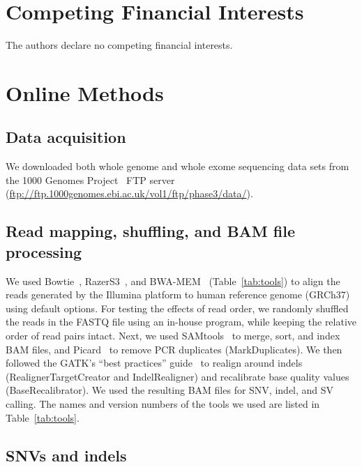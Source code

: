 \documentclass[10pt,a4paper]{article}
\begin{document}
\section*{Competing Financial Interests}
The authors declare no competing financial interests.

\small




\clearpage

\section*{Online Methods}

\subsection*{Data acquisition}

We downloaded both whole genome and whole exome sequencing data sets from the 1000 Genomes Project~\cite{1000GP2012,1000GP2015} 
FTP server (\url{ftp://ftp.1000genomes.ebi.ac.uk/vol1/ftp/phase3/data/}).

\subsection*{Read mapping, shuffling, and BAM file processing}
We used  Bowtie~\cite{Langmead2009}, RazerS3~\cite{Weese2012}, and BWA-MEM~\cite{Li2009a,Li2013} %
(Table~\ref{tab:tools}) 
to align the reads generated by the Illumina 
platform to human reference genome (GRCh37) using default options. For testing the effects of read order, we randomly 
shuffled the reads in the FASTQ file using an in-house program, while keeping the relative order of read pairs intact.
Next, we used SAMtools~\cite{Li2009b} to merge, sort, and index BAM files, and Picard~\cite{picard} to remove PCR duplicates (MarkDuplicates).
We then followed the GATK's ``best practices'' guide~\cite{VanderAuwera2013} to
realign around indels (RealignerTargetCreator and IndelRealigner) and recalibrate base quality values (BaseRecalibrator). We used the 
resulting BAM files for SNV, indel, and SV calling. The names and version numbers of the tools we used are listed in Table~\ref{tab:tools}.


\subsection*{SNVs and indels}
\end{document}

